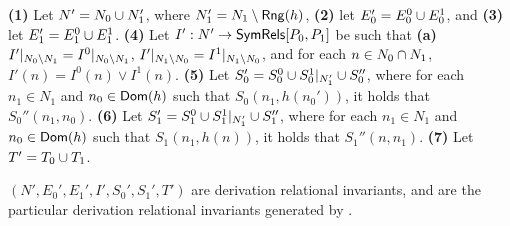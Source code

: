 \textbf{(1)} Let $N' = N_0 \cup N_1'$, where $N_1' = N_1 \setminus
\mathsf{Rng}(h)$,
\textbf{(2)} let $E_0' = E_0^0 \cup E_0^1$, and
\textbf{(3)} let $E_1' = E_1^0 \cup E_1^1$.
\textbf{(4)} Let $I' : N' \to \mathsf{SymRels}[ P_0, P_1 ]$ be such that %
\textbf{(a)} $I'|_{N_0 \setminus N_1} = I^0|_{N_0
  \setminus N_1}$, %
$I'|_{N_1 \setminus N_0} = I^1|_{N_1
  \setminus N_0}$, and %
for each $n \in N_0 \cap N_1$, $I'(n) = I^0(n) \lor
I^1(n)$.
\textbf{(5)} Let $S_0' = S_0^0 \cup S_0^1|_{N_1'} \cup
S_0''$, where for each $n_1 \in N_1$ and $n_0 \in \mathsf{Dom}(h)$ such
that $S_0(n_1, h(n_0'))$, it holds that $S_0''(n_1, n_0)$.
\textbf{(6)} Let $S_1' = S_1^0 \cup S_1^1|_{N_1'} \cup
S_1''$, where for each $n_1 \in N_1$ and $n_0 \in \mathsf{Dom}(h)$ such
that $S_1(n_1, h(n))$, it holds that $S_1''(n, n_1)$.
\textbf{(7)} Let $T' = T_0 \cup T_1$.

$(N', E_0', E_1', I', S_0', S_1', T')$ are derivation relational
invariants, and are the particular derivation relational invariants
generated by \mergeinvs.

